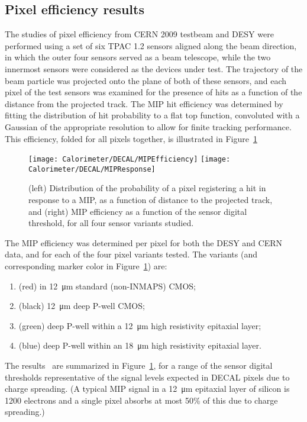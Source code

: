 \subsection{Pixel efficiency results}
The studies of pixel efficiency from CERN 2009 testbeam and DESY were performed using a
set of six TPAC 1.2 sensors aligned along the beam direction, in which the outer four sensors
served as a beam telescope, while the two innermost sensors were considered as the devices
under test. The trajectory of the beam particle was projected onto the plane of both of these
sensors, and each pixel of the test sensors was examined for the presence of hits as a function
of the distance from the projected track. The MIP hit efficiency was determined by fitting
the distribution of hit probability to a flat top function, convoluted with a Gaussian of the
appropriate resolution to allow for finite tracking performance. This efficiency, folded for all
pixels together, is illustrated in Figure~\ref{fig:Calorimeter:DECAL:MIPS}

\begin{figure}
    \texttt{[image: Calorimeter/DECAL/MIPEfficiency]}
    \texttt{[image: Calorimeter/DECAL/MIPResponse]}
    \caption{(left) Distribution of the probability of a pixel registering a hit in response to a MIP, as a function of distance to the projected track, and (right) MIP efficiency as a function of the sensor digital threshold, for all four sensor variants studied.}
    \label{fig:Calorimeter:DECAL:MIPS}
\end{figure}

The MIP efficiency was determined per pixel for both the DESY and CERN data, and for each of the four pixel variants tested. The variants (and corresponding marker color in Figure~\ref{fig:Calorimeter:DECAL:MIPS}) are:

\begin{enumerate}
\item (red) in \SI{12}{\micro\meter} standard (non-INMAPS) CMOS;
\item (black) \SI{12}{\micro\meter} deep P-well CMOS;
\item (green) deep P-well within a \SI{12}{\micro\meter} high resistivity epitaxial layer;
\item (blue) deep P-well within an \SI{18}{\micro\meter} high resistivity epitaxial layer.
\end{enumerate}

The results~\cite{Dauncey:2010zz} are summarized in Figure~\ref{fig:Calorimeter:DECAL:MIPS}, for a range of the sensor digital thresholds representative of the signal levels expected in DECAL pixels due to charge spreading. (A typical MIP signal in a \SI{12}{\micro\meter} epitaxial layer of silicon is 1200 electrons and a single pixel absorbs at most 50\% of this due to charge spreading.)

